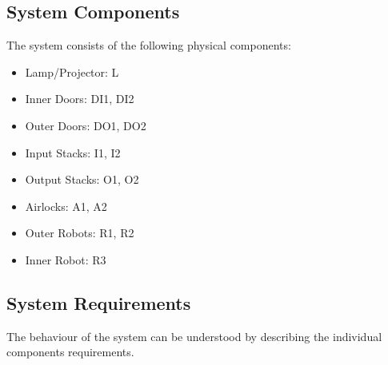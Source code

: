 \documentclass[a4paper,12pt]{article}
\begin{document}
\subsection{System Components}
The system consists of the following physical components:
\begin{itemize}
\item Lamp/Projector: L
\item Inner Doors: DI1, DI2
\item Outer Doors: DO1, DO2
\item Input Stacks: I1, I2
\item Output Stacks: O1, O2
\item Airlocks: A1, A2
\item Outer Robots: R1, R2
\item Inner Robot: R3
\end{itemize}


\subsection{System Requirements}
The behaviour of the system can be understood by describing the individual components requirements.
\end{document}
